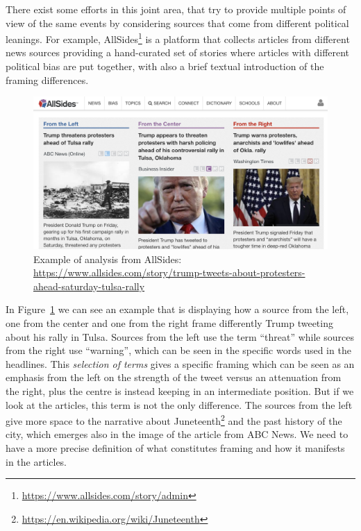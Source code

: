There exist some efforts in this joint area, that try to provide multiple points of view of the same events by considering sources that come from different political leanings.
For example, AllSides\footnote{\url{https://www.allsides.com/story/admin}} is a platform that collects articles from different news sources providing a hand-curated set of stories where articles with different political bias are put together, with also a brief textual introduction of the framing differences.

\begin{figure}[!htb]
    \centering
    \includegraphics[width=\linewidth]{figures/allsides.png}
    \caption{Example of analysis from AllSides: \url{https://www.allsides.com/story/trump-tweets-about-protesters-ahead-saturday-tulsa-rally}}
    \label{fig:allsides}
\end{figure}

In Figure~\ref{fig:allsides} we can see an example that is displaying how a source from the left, one from the center and one from the right frame differently Trump tweeting about his rally in Tulsa.
Sources from the left use the term ``threat'' while sources from the right use ``warning'', which can be seen in the specific words used in the headlines.
This \emph{selection of terms} gives a specific framing which can be seen as an emphasis from the left on the strength of the tweet versus an attenuation from the right, plus the centre is instead keeping in an intermediate position.
But if we look at the articles, this term is not the only difference. The sources from the left give more space to the narrative about Juneteenth\footnote{\url{https://en.wikipedia.org/wiki/Juneteenth}} and the past history of the city, which emerges also in the image of the article from ABC News.
We need to have a more precise definition of what constitutes framing and how it manifests in the articles.

